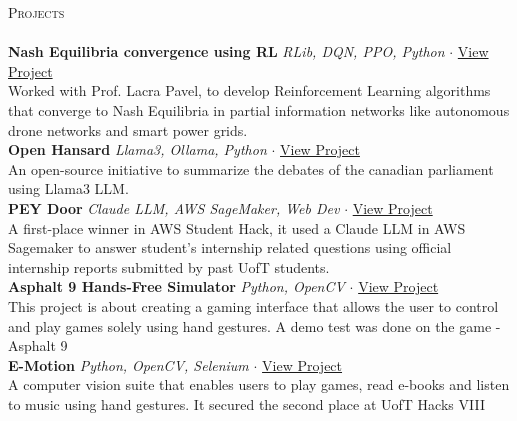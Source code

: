 \documentclass[a4paper]{article}
\newcommand{\lineunder} {
    \vspace*{-8pt} \\
    \hspace*{-18pt} \hrulefill \\
}
\newcommand{\header} [1] {
    {\hspace*{-18pt}\vspace*{6pt} \textsc{#1}}
    \vspace*{-6pt} \lineunder
}
\begin{document}
\header{Projects}
{\textbf{Nash Equilibria convergence using RL}} {\sl RLib, DQN, PPO, Python} $\cdot$ \href{https://github.com/BoundlessDevelopment/Capstone-Project}{View Project}\\
Worked with Prof. Lacra Pavel, to develop Reinforcement Learning algorithms that converge to Nash Equilibria in partial information networks
 like autonomous drone networks and smart power grids.\\
\vspace*{1mm}
{\textbf{Open Hansard}} {\sl Llama3, Ollama, Python} $\cdot$ \href{https://github.com/pandyah5/open-hansard}{View Project}\\
An open-source initiative to summarize the debates of the canadian parliament using Llama3 LLM.\\
\vspace*{1mm}
{\textbf{PEY Door}} {\sl Claude LLM, AWS SageMaker, Web Dev} $\cdot$ \href{https://devpost.com/software/peydoor}{View Project}\\
A first-place winner in AWS Student Hack, it used a Claude LLM in AWS Sagemaker to answer student's internship related questions using official internship reports submitted by past UofT students.\\
\vspace*{1mm}
{\textbf{Asphalt 9 Hands-Free Simulator}} {\sl Python, OpenCV} $\cdot$ \href{https://github.com/pandyah5/asphalt9_OpenCV_Simulation?tab=readme-ov-file}{View Project} \\
This project is about creating a gaming interface that allows the user to control and play games solely using hand gestures. A demo test was done on the game - Asphalt 9\\
\vspace*{1mm}
{\textbf{E-Motion}} {\sl Python, OpenCV, Selenium} $\cdot$ \href{https://devpost.com/software/e-motion-otbl2i}{View Project} \\
A computer vision suite that enables users to play games, read e-books and listen to music using hand gestures. It secured the second place at UofT Hacks VIII\\
\end{document}
